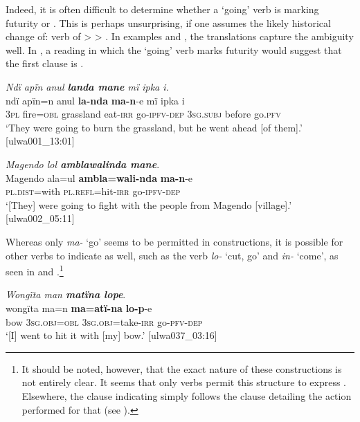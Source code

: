 Indeed, it is often difficult to determine whether a ‘going’ verb is marking futurity or . This is perhaps unsurprising, if one assumes the likely historical change of: verb of  >  > . In examples  and , the  translations capture the ambiguity well. In , a reading in which the ‘going’ verb marks futurity would suggest that the first clause is .

\ea%
    \label{ex:pred:61}
          \textit{Ndï apïn anul \textbf{landa mane} mï ipka i.}\\
\gll    ndï  apïn=n    anul    \textbf{la-nda}  \textbf{ma-n}{}-e    mï      ipka i\\
    3\textsc{pl}  fire=\textsc{obl}  grassland  eat-\textsc{irr}  go-\textsc{ipfv-dep}  3\textsc{sg.subj}  before  go.\textsc{pfv}\\
\glt `They were going to burn the grassland, but he went ahead [of them].’ [ulwa001\_13:01]
\z


\ea%
    \label{ex:pred:62}
          \textit{Magendo lol \textbf{amblawalinda mane}}.\\
\gll Magendo  ala=ul      \textbf{ambla=wali-nda}  \textbf{ma-n}{}-e\\
    [place]    \textsc{pl.dist}=with  \textsc{pl.refl}=hit-\textsc{irr}  go-\textsc{ipfv-dep}\\
\glt `[They] were going to fight with the people from Magendo [village].’ [ulwa002\_05:11]
\z

Whereas only \textit{ma-} ‘go’ seems to be permitted in   constructions, it is possible for other  verbs to indicate  as well, such as the verb \textit{lo-} ‘cut, go’ and \textit{in-} ‘come’, as seen in  and .\footnote{It should be noted, however, that the exact  nature of these  constructions is not entirely clear. It seems that only  verbs permit this  structure to express . Elsewhere, the clause indicating  simply follows the clause detailing the action performed for that  (see ).}

\ea%
    \label{ex:pred:63}
          \textit{Wongïta man \textbf{matïna lope}}.\\
\gll wongïta  ma=n      \textbf{ma=atï-na}      \textbf{lo-p}{}-e\\
    bow    3\textsc{sg.obj=obl}  3\textsc{sg.obj}=take-\textsc{irr}  go-\textsc{pfv-dep}\\
\glt `[I] went to hit it with [my] bow.’ [ulwa037\_03:16]
\z

